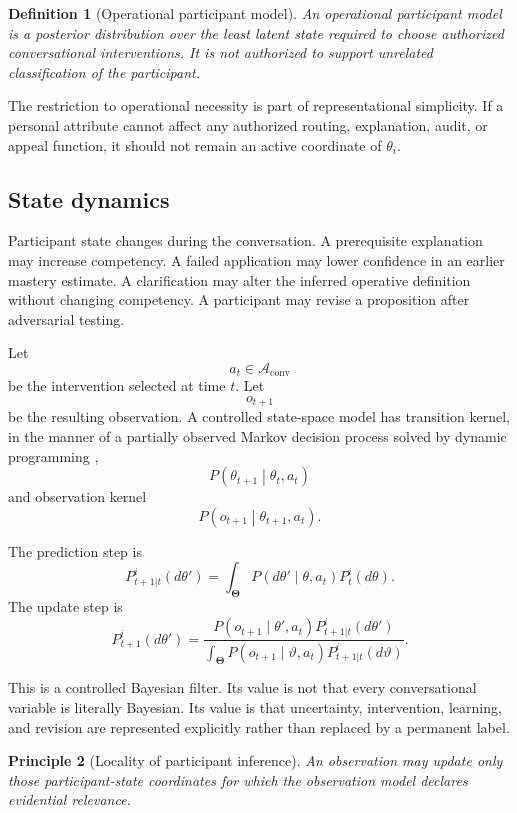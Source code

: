 \documentclass[11pt]{article}
\newtheorem{definition}{Definition}[section]
\newtheorem{principle}[definition]{Principle}
\theoremstyle{definition}
\newcommand{\ThetaSpace}{\boldsymbol{\Theta}}
\begin{document}
\begin{definition}[Operational participant model]
An operational participant model is a posterior distribution over the least latent state required to choose authorized conversational interventions. It is not authorized to support unrelated classification of the participant.
\end{definition}

The restriction to operational necessity is part of representational simplicity. If a personal attribute cannot affect any authorized routing, explanation, audit, or appeal function, it should not remain an active coordinate of \(\theta_i\).

\subsection{State dynamics}

Participant state changes during the conversation. A prerequisite explanation may increase competency. A failed application may lower confidence in an earlier mastery estimate. A clarification may alter the inferred operative definition without changing competency. A participant may revise a proposition after adversarial testing.

Let
\[
a_t\in\mathcal A_{\mathrm{conv}}
\]
be the intervention selected at time \(t\). Let
\[
o_{t+1}
\]
be the resulting observation. A controlled state-space model has transition kernel, in the manner of a partially observed Markov decision process solved by dynamic programming \cite{puterman1994,bertsekas2017},
\[
P
\left(
\theta_{t+1}
\middle|
\theta_t,a_t
\right)
\]
and observation kernel
\[
P
\left(
o_{t+1}
\middle|
\theta_{t+1},a_t
\right).
\]

The prediction step is
\[
P_{t+1|t}^i(d\theta')
=
\int_{\ThetaSpace}
P(d\theta'\mid\theta,a_t)
P_t^i(d\theta).
\]
The update step is
\[
P_{t+1}^i(d\theta')
=
\frac{
P(o_{t+1}\mid\theta',a_t)
P_{t+1|t}^i(d\theta')
}{
\int_{\ThetaSpace}
P(o_{t+1}\mid\vartheta,a_t)
P_{t+1|t}^i(d\vartheta)
}.
\]

This is a controlled Bayesian filter. Its value is not that every conversational variable is literally Bayesian. Its value is that uncertainty, intervention, learning, and revision are represented explicitly rather than replaced by a permanent label.

\begin{principle}[Locality of participant inference]
An observation may update only those participant-state coordinates for which the observation model declares evidential relevance.
\end{principle}
\end{document}
